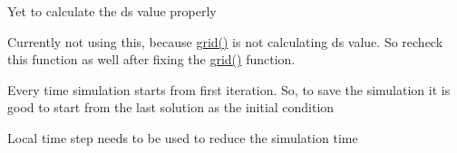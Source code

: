 \begin{DoxyRefList}
Yet to calculate the ds value properly  
\item[\label{bug__bug000007}%
\hypertarget{bug__bug000007}{}%
File \hyperlink{local__time__step_8h}{local\+\_\+time\+\_\+step.h} ]Currently not using this, because \hyperlink{grid__ideal__nozzle_8h_a6cdf5cf168063009e847db46d6624c1b}{grid()} is not calculating ds value. So recheck this function as well after fixing the \hyperlink{grid__ideal__nozzle_8h_a6cdf5cf168063009e847db46d6624c1b}{grid()} function.  
\item[\label{bug__bug000008}%
\hypertarget{bug__bug000008}{}%
Member \hyperlink{TVD_8cpp_ae66f6b31b5ad750f1fe042a706a4e3d4}{main} ()]Every time simulation starts from first iteration. So, to save the simulation it is good to start from the last solution as the initial condition 

Local time step needs to be used to reduce the simulation time 
\end{DoxyRefList}